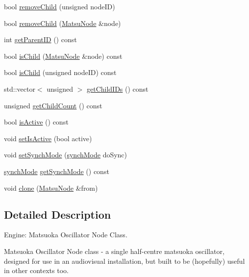 \begin{DoxyCompactItemize}
bool \mbox{\hyperlink{classMatsuNode_aa6251aafed3ea1af9ee0548a5707901c}{remove\+Child}} (unsigned node\+ID)
\item 
bool \mbox{\hyperlink{classMatsuNode_a0e170c6154bbc7ba1f668f7d0a9ac274}{remove\+Child}} (\mbox{\hyperlink{classMatsuNode}{Matsu\+Node}} \&node)
\item 
int \mbox{\hyperlink{classMatsuNode_a82424915e6d706f75287de36bac0e328}{get\+Parent\+ID}} () const
\item 
bool \mbox{\hyperlink{classMatsuNode_a19bac62758d1a610241672a2ef0a945a}{is\+Child}} (\mbox{\hyperlink{classMatsuNode}{Matsu\+Node}} \&node) const
\item 
bool \mbox{\hyperlink{classMatsuNode_a34f20a52ff0ac6a5119ed4a5439e03fc}{is\+Child}} (unsigned node\+ID) const
\item 
std\+::vector$<$ unsigned $>$ \mbox{\hyperlink{classMatsuNode_aa4a09dd1a86372a220a0549eac276e72}{get\+Child\+I\+Ds}} () const
\item 
unsigned \mbox{\hyperlink{classMatsuNode_ab05b1c63fa437472cdbbf5fa42337360}{get\+Child\+Count}} () const
\item 
bool \mbox{\hyperlink{classMatsuNode_a9d0ba571735d4e64323e859cec53761c}{is\+Active}} () const
\item 
void \mbox{\hyperlink{classMatsuNode_a120dfca98155fded8d1ccac0f5236ecd}{set\+Is\+Active}} (bool active)
\item 
void \mbox{\hyperlink{classMatsuNode_a31c979f10f4c1482204ec19a2868caf1}{set\+Synch\+Mode}} (\mbox{\hyperlink{classMatsuNode_a725e228db39b8842f851ddf88f640bed}{synch\+Mode}} do\+Sync)
\item 
\mbox{\hyperlink{classMatsuNode_a725e228db39b8842f851ddf88f640bed}{synch\+Mode}} \mbox{\hyperlink{classMatsuNode_a1529b4c1b11490c66f023d7afe55fae7}{get\+Synch\+Mode}} () const
\item 
void \mbox{\hyperlink{classMatsuNode_a540f3663464549a9dba2c4b41d9930de}{clone}} (\mbox{\hyperlink{classMatsuNode}{Matsu\+Node}} \&from)
\end{DoxyCompactItemize}


\subsection{Detailed Description}
Engine\+: Matsuoka Oscillator Node Class. 

Matsuoka Oscillator Node class -\/ a single half-\/centre matsuoka oscillator, designed for use in an audiovisual installation, but built to be (hopefully) useful in other contexts too.

